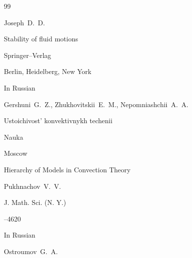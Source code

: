 








\begin{thebibliography}{99} 




\by Joseph~D.~D.

\book Stability of fluid motions


\publ Springer–Verlag

\publaddr Berlin, Heidelberg, New York







\lang In Russian

\by Gershuni~G.~Z., Zhukhovitskii~E.~M., Nepomniashchii~A.~A.

\book Ustoichivost' konvektivnykh techenii


\publ Nauka

\publaddr Moscow








\paper Hierarchy of Models in Convection Theory

\by Pukhnachov~V.~V.

\jour J. Math. Sci. (N. Y.)




--4620





\lang In Russian

\by Ostroumov~G.~A.


\end{thebibliography}
